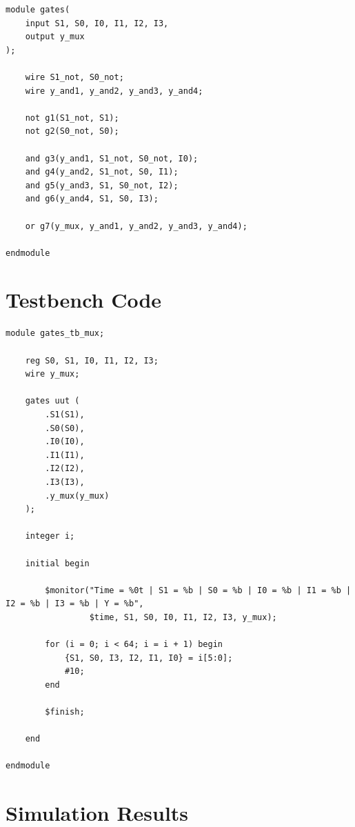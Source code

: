 \documentclass[12pt,a4paper]{report}
\begin{document}
\begin{verilogbox}
\begin{lstlisting}
module gates(
    input S1, S0, I0, I1, I2, I3,
    output y_mux
);

    wire S1_not, S0_not;
    wire y_and1, y_and2, y_and3, y_and4;

    not g1(S1_not, S1);
    not g2(S0_not, S0);

    and g3(y_and1, S1_not, S0_not, I0);
    and g4(y_and2, S1_not, S0, I1);
    and g5(y_and3, S1, S0_not, I2);
    and g6(y_and4, S1, S0, I3);

    or g7(y_mux, y_and1, y_and2, y_and3, y_and4);

endmodule
\end{lstlisting}
\end{verilogbox}

\section{Testbench Code}

\begin{verilogbox}
\begin{lstlisting}
module gates_tb_mux;

    reg S0, S1, I0, I1, I2, I3;
    wire y_mux;

    gates uut (
        .S1(S1),
        .S0(S0),
        .I0(I0),
        .I1(I1),
        .I2(I2),
        .I3(I3),
        .y_mux(y_mux)
    );

    integer i;

    initial begin

        $monitor("Time = %0t | S1 = %b | S0 = %b | I0 = %b | I1 = %b | I2 = %b | I3 = %b | Y = %b",
                 $time, S1, S0, I0, I1, I2, I3, y_mux);

        for (i = 0; i < 64; i = i + 1) begin
            {S1, S0, I3, I2, I1, I0} = i[5:0];
            #10;
        end

        $finish;

    end

endmodule
\end{lstlisting}
\end{verilogbox}

\section{Simulation Results}
\end{document}
